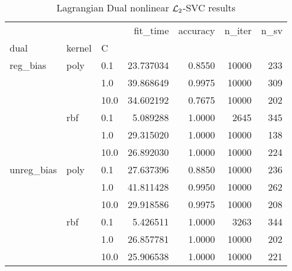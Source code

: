 \begin{table}[H]
\centering
\caption{Lagrangian Dual nonlinear $\protect \mathcal{L}_2$-SVC results}
\label{nonlinear_lagrangian_dual_l2_svc_cv_results}
\begin{tabular}{lllrrrr}
\toprule
           &     &      &   fit\_time &  accuracy &  n\_iter &  n\_sv \\
dual & kernel & C &            &           &         &       \\
\midrule
reg\_bias & poly & 0.1  &  23.737034 &    0.8550 &   10000 &   233 \\
           &     & 1.0  &  39.868649 &    0.9975 &   10000 &   309 \\
           &     & 10.0 &  34.602192 &    0.7675 &   10000 &   202 \\
           & rbf & 0.1  &   5.089288 &    1.0000 &    2645 &   345 \\
           &     & 1.0  &  29.315020 &    1.0000 &   10000 &   138 \\
           &     & 10.0 &  26.892030 &    1.0000 &   10000 &   224 \\
unreg\_bias & poly & 0.1  &  27.637396 &    0.8850 &   10000 &   236 \\
           &     & 1.0  &  41.811428 &    0.9950 &   10000 &   262 \\
           &     & 10.0 &  29.918586 &    0.9975 &   10000 &   208 \\
           & rbf & 0.1  &   5.426511 &    1.0000 &    3263 &   344 \\
           &     & 1.0  &  26.857781 &    1.0000 &   10000 &   202 \\
           &     & 10.0 &  25.906538 &    1.0000 &   10000 &   221 \\
\bottomrule
\end{tabular}
\end{table}
